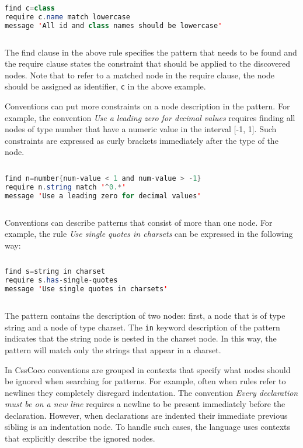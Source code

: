 \documentclass[parskip=full]{uvamscse}
\begin{document}
\begin{sourcecode}
\begin{lstlisting}[style=mono,language=Java]
find c=class
require c.name match lowercase
message 'All id and class names should be lowercase'
\end{lstlisting}
\end{sourcecode}

The find clause in the above rule specifies the pattern that needs to be found and the require
clause states the constraint that should be applied to the discovered nodes. Note that to refer to a
matched node in the require clause, the node should be assigned as identifier, \texttt{c} in the
above example.

Conventions can put more constraints on a node description in the pattern. For example, the
convention \textit{Use a leading zero for decimal values} requires finding all nodes of type number
that have a numeric value in the interval [-1, 1]. Such constraints are expressed as curly brackets
immediately after the type of the node.

\begin{sourcecode}
\begin{lstlisting}[style=mono,language=Java]
find n=number{num-value < 1 and num-value > -1}
require n.string match '^0.*'
message 'Use a leading zero for decimal values'
\end{lstlisting}
\end{sourcecode}

Conventions can describe patterns that consist of more than one node. For example, the rule
\textit{Use single quotes in charsets} can be expressed in the following way:

\begin{sourcecode}
\begin{lstlisting}[style=mono,language=Java]
find s=string in charset
require s.has-single-quotes
message 'Use single quotes in charsets'
\end{lstlisting}
\end{sourcecode}

The pattern contains the description of two nodes: first, a node that is of type string and a node
of type charset. The \texttt{in} keyword description of the pattern indicates that the string node
is nested in the charset node. In this way, the pattern will match only the strings that appear in a
charset.

In CssCoco conventions are grouped in contexts that specify what nodes should be ignored when
searching for patterns. For example, often when rules refer to newlines they completely disregard
indentation. The convention \textit{Every declaration must be on a new line} requires a newline to
be present immediately before the declaration. However, when declarations are indented their
immediate previous sibling is an indentation node. To handle such cases, the language uses contexts
that explicitly describe the ignored nodes.
\end{document}
